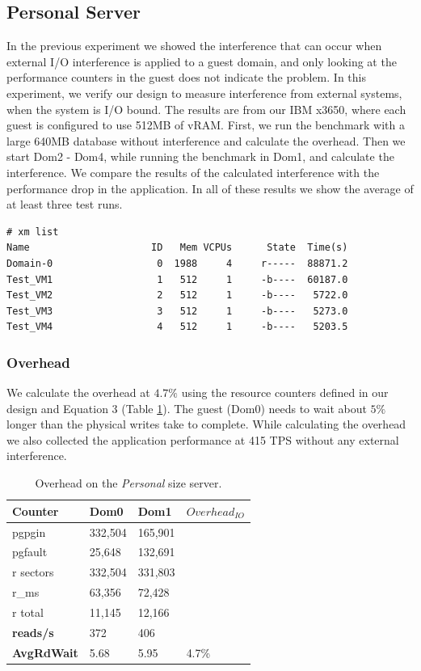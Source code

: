 \subsection{Personal Server}
In the previous experiment we showed the interference that can occur when external I/O interference is applied to a guest domain, and only looking at the performance counters in the guest does not indicate the problem.  In this experiment, we verify our design to measure interference from external systems, when the system is I/O bound.  The results are from our IBM x3650, where each guest is configured to use 512MB of vRAM.  First, we run the benchmark with a large 640MB database without interference and calculate the overhead.  Then we start Dom2 - Dom4, while running the benchmark in Dom1, and calculate the interference.  We compare the results of the calculated interference with the performance drop in the application.  In all of these results we show the average of at least three test runs.

\begin{Verbatim}
# xm list
Name                     ID   Mem VCPUs      State  Time(s)
Domain-0                  0  1988     4     r-----  88871.2
Test_VM1                  1   512     1     -b----  60187.0
Test_VM2                  2   512     1     -b----   5722.0
Test_VM3                  3   512     1     -b----   5273.0
Test_VM4                  4   512     1     -b----   5203.5
\end{Verbatim}

\subsubsection{Overhead}
We calculate the overhead at $4.7\%$ using the resource counters defined in our design and Equation 3 (Table \ref{tab:OverheadSmall}).  The guest (Dom0) needs to wait about $5\%$ longer than the physical writes take to complete.  While calculating the overhead we also collected the application performance at 415 TPS without any external interference.

\begin{table}[h]
\begin{tabular}{ l l l p{5cm} }
  Counter     & Dom0 & Dom1 & $Overhead_{IO}$ \\
  \hline
	pgpgin    & 332,504 & 165,901  &  \\
	pgfault   &  25,648 & 132,691  & \\
	r sectors & 332,504 & 331,803  &\\
	r\_ms     &  63,356 &  72,428  & \\
	r total   &  11,145 &  12,166  & \\
    \textbf{reads/s}    & 372 & 406 & \\
    \textbf{AvgRdWait}  & 5.68 & 5.95 & 4.7\% \\ 
  \hline
\end{tabular}
\caption{Overhead on the \emph{Personal} size server.}
\label{tab:OverheadSmall}
\end{table}

